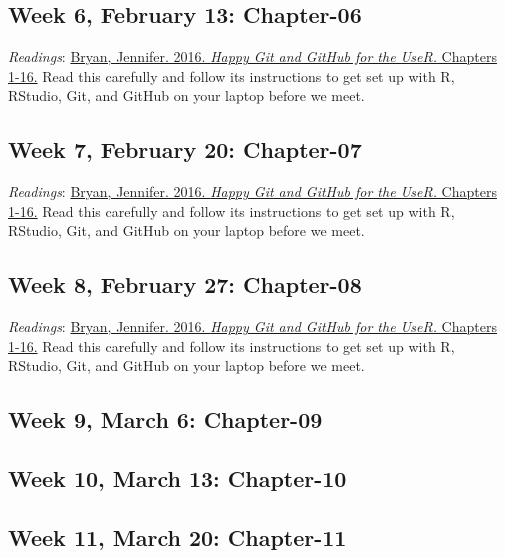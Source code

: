 \documentclass[]{article}
\begin{document}
\hypertarget{week-6-february-13-chapter-06}{%
\subsection{Week 6, February 13:
Chapter-06}\label{week-6-february-13-chapter-06}}

\emph{Readings}: \href{http://happygitwithr.com}{Bryan, Jennifer. 2016.
\textit{Happy Git and GitHub for the UseR.} Chapters 1-16.} Read this
carefully and follow its instructions to get set up with \textsf{R},
RStudio, Git, and GitHub on your laptop before we meet.

\hypertarget{week-7-february-20-chapter-07}{%
\subsection{Week 7, February 20:
Chapter-07}\label{week-7-february-20-chapter-07}}

\emph{Readings}: \href{http://happygitwithr.com}{Bryan, Jennifer. 2016.
\textit{Happy Git and GitHub for the UseR.} Chapters 1-16.} Read this
carefully and follow its instructions to get set up with \textsf{R},
RStudio, Git, and GitHub on your laptop before we meet.

\hypertarget{week-8-february-27-chapter-08}{%
\subsection{Week 8, February 27:
Chapter-08}\label{week-8-february-27-chapter-08}}

\emph{Readings}: \href{http://happygitwithr.com}{Bryan, Jennifer. 2016.
\textit{Happy Git and GitHub for the UseR.} Chapters 1-16.} Read this
carefully and follow its instructions to get set up with \textsf{R},
RStudio, Git, and GitHub on your laptop before we meet.

\hypertarget{week-9-march-6-chapter-09}{%
\subsection{Week 9, March 6:
Chapter-09}\label{week-9-march-6-chapter-09}}

\hypertarget{week-10-march-13-chapter-10}{%
\subsection{Week 10, March 13:
Chapter-10}\label{week-10-march-13-chapter-10}}

\hypertarget{week-11-march-20-chapter-11}{%
\subsection{Week 11, March 20:
Chapter-11}\label{week-11-march-20-chapter-11}}
\end{document}
